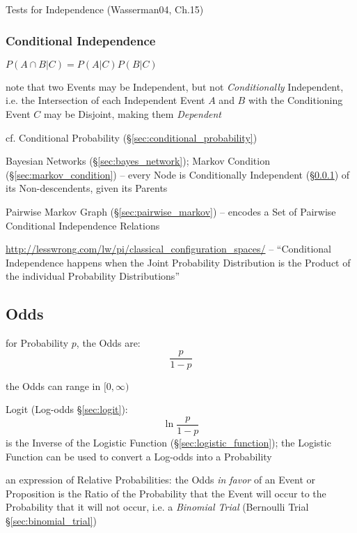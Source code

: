 Tests for Independence (Wasserman04, Ch.15) %



\subsubsection{Conditional Independence}\label{sec:conditional_independence}

$P(A \cap B | C) = P(A|C)P(B|C)$

note that two Events may be Independent, but not \emph{Conditionally}
Independent, i.e. the Intersection of each Independent Event $A$ and $B$ with
the Conditioning Event $C$ may be Disjoint, making them \emph{Dependent}

\fist cf. Conditional Probability (\S\ref{sec:conditional_probability})

\fist Bayesian Networks (\S\ref{sec:bayes_network});
Markov Condition (\S\ref{sec:markov_condition}) -- every Node is Conditionally
Independent (\S\ref{sec:conditional_independence}) of its Non-descendents, given
its Parents

\fist Pairwise Markov Graph (\S\ref{sec:pairwise_markov}) -- encodes a Set
of Pairwise Conditional Independence Relations

\url{http://lesswrong.com/lw/pi/classical_configuration_spaces/}
-- ``Conditional Independence happens when the Joint Probability Distribution
is the Product of the individual Probability Distributions''



\subsection{Odds}\label{sec:odds}

for Probability $p$, the Odds are:
\[
  \frac{p}{1-p}
\]

the Odds can range in $[0, \infty)$

\fist Logit (Log-odds \S\ref{sec:logit}):
\[
  \ln \frac{p}{1-p}
\]
is the Inverse of the Logistic Function (\S\ref{sec:logistic_function}); the
Logistic Function can be used to convert a Log-odds into a Probability

an expression of Relative Probabilities: the Odds \emph{in favor} of an Event or
Proposition is the Ratio of the Probability that the Event will occur to the
Probability that it will not occur, i.e. a \emph{Binomial Trial}
(Bernoulli Trial \S\ref{sec:binomial_trial})



